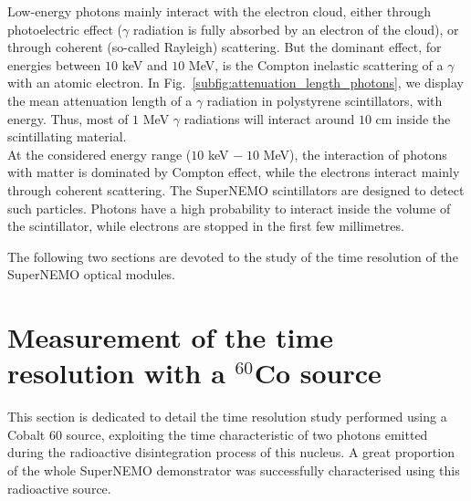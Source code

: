 Low-energy photons mainly interact with the electron cloud, either through photoelectric effect ($\gamma$ radiation is fully absorbed by an electron of the cloud), or through coherent (so-called Rayleigh) scattering.
But the dominant effect, for energies between $10$ keV and $10$ MeV, is the Compton inelastic scattering of a $\gamma$ with an atomic electron.
In Fig.~\ref{subfig:attenuation_length_photons}, we display the mean attenuation length of a $\gamma$ radiation in polystyrene scintillators, with energy.
Thus, most of $1$ MeV $\gamma$ radiations will interact around $10$ cm inside the scintillating material.\\

At the considered energy range ($10$ keV $ -\; 10$ MeV), the interaction of photons with matter is dominated by Compton effect, while the electrons interact mainly through coherent scattering.
The SuperNEMO scintillators are designed to detect such particles.
Photons have a high probability to interact inside the volume of the scintillator, while electrons are stopped in the first few millimetres.

The following two sections are devoted to the study of the time resolution of the SuperNEMO optical modules.



\section{Measurement of the time resolution with a $^{60}$Co source}
\label{sec:Co_analysis}
This section is dedicated to detail the time resolution study performed using a Cobalt $60$ source, exploiting the time characteristic of two photons emitted during the radioactive disintegration process of this nucleus.
A great proportion of the whole SuperNEMO demonstrator was successfully characterised using this radioactive source.

